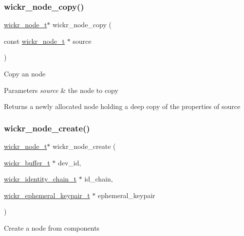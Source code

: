 \subsubsection{\texorpdfstring{wickr\_node\_copy()}{wickr\_node\_copy()}}
{\footnotesize\ttfamily \mbox{\hyperlink{structwickr__node}{wickr\+\_\+node\+\_\+t}}$\ast$ wickr\+\_\+node\+\_\+copy (\begin{DoxyParamCaption}\item[{const \mbox{\hyperlink{structwickr__node}{wickr\+\_\+node\+\_\+t}} $\ast$}]{source }\end{DoxyParamCaption})}

Copy an node


\begin{DoxyParams}{Parameters}
{\em source} & the node to copy \\
\hline
\end{DoxyParams}
\begin{DoxyReturn}{Returns}
a newly allocated node holding a deep copy of the properties of \textquotesingle{}source\textquotesingle{} 
\end{DoxyReturn}
\mbox{\label{group__wickr__node_ga293b1210648e2db5449be23fe0f3e644}} 
\subsubsection{\texorpdfstring{wickr\_node\_create()}{wickr\_node\_create()}}
{\footnotesize\ttfamily \mbox{\hyperlink{structwickr__node}{wickr\+\_\+node\+\_\+t}}$\ast$ wickr\+\_\+node\+\_\+create (\begin{DoxyParamCaption}\item[{\mbox{\hyperlink{structwickr__buffer}{wickr\+\_\+buffer\+\_\+t}} $\ast$}]{dev\+\_\+id,  }\item[{\mbox{\hyperlink{structwickr__identity__chain}{wickr\+\_\+identity\+\_\+chain\+\_\+t}} $\ast$}]{id\+\_\+chain,  }\item[{\mbox{\hyperlink{structwickr__ephemeral__keypair}{wickr\+\_\+ephemeral\+\_\+keypair\+\_\+t}} $\ast$}]{ephemeral\+\_\+keypair }\end{DoxyParamCaption})}

Create a node from components


